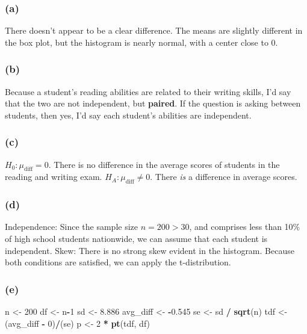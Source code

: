 \documentclass[]{article}
\newenvironment{Shaded}{\begin{snugshade}}{\end{snugshade}}
\newcommand{\KeywordTok}[1]{\textcolor[rgb]{0.13,0.29,0.53}{\textbf{#1}}}
\newcommand{\DecValTok}[1]{\textcolor[rgb]{0.00,0.00,0.81}{#1}}
\newcommand{\FloatTok}[1]{\textcolor[rgb]{0.00,0.00,0.81}{#1}}
\newcommand{\StringTok}[1]{\textcolor[rgb]{0.31,0.60,0.02}{#1}}
\newcommand{\OperatorTok}[1]{\textcolor[rgb]{0.81,0.36,0.00}{\textbf{#1}}}
\newcommand{\NormalTok}[1]{#1}
\begin{document}
\subsubsection{(a)}\label{a-1}

There doesn't appear to be a clear difference. The means are slightly
different in the box plot, but the histogram is nearly normal, with a
center close to 0.

\subsubsection{(b)}\label{b-1}

Because a student's reading abilities are related to their writing
skills, I'd say that the two are not independent, but \textbf{paired}.
If the question is asking between students, then yes, I'd say each
student's abilities are independent.

\subsubsection{(c)}\label{c-1}

\(H_0: \mu_{\text{diff}} = 0.\) There is no difference in the average
scores of students in the reading and writing exam.
\(H_A: \mu_{\text{diff}} \neq 0.\) There \emph{is} a difference in
average scores.

\subsubsection{(d)}\label{d}

Independence: Since the sample size \(n = 200 > 30\), and comprises less
than 10\% of high school students nationwide, we can assume that each
student is independent. Skew: There is no strong skew evident in the
histogram. Because both conditions are satisfied, we can apply the
t-distribution.

\subsubsection{(e)}\label{e}

\begin{Shaded}
\begin{Highlighting}[]
\NormalTok{n <-}\StringTok{ }\DecValTok{200}
\NormalTok{df <-}\StringTok{ }\NormalTok{n}\OperatorTok{-}\DecValTok{1}
\NormalTok{sd <-}\StringTok{ }\FloatTok{8.886}
\NormalTok{avg_diff <-}\StringTok{ }\OperatorTok{-}\FloatTok{0.545}
\NormalTok{se <-}\StringTok{ }\NormalTok{sd }\OperatorTok{/}\StringTok{ }\KeywordTok{sqrt}\NormalTok{(n)}
\NormalTok{tdf <-}\StringTok{ }\NormalTok{(avg_diff }\OperatorTok{-}\StringTok{ }\DecValTok{0}\NormalTok{)}\OperatorTok{/}\NormalTok{(se)}
\NormalTok{p <-}\StringTok{ }\DecValTok{2} \OperatorTok{*}\StringTok{ }\KeywordTok{pt}\NormalTok{(tdf, df)}
\end{Highlighting}
\end{Shaded}
\end{document}
